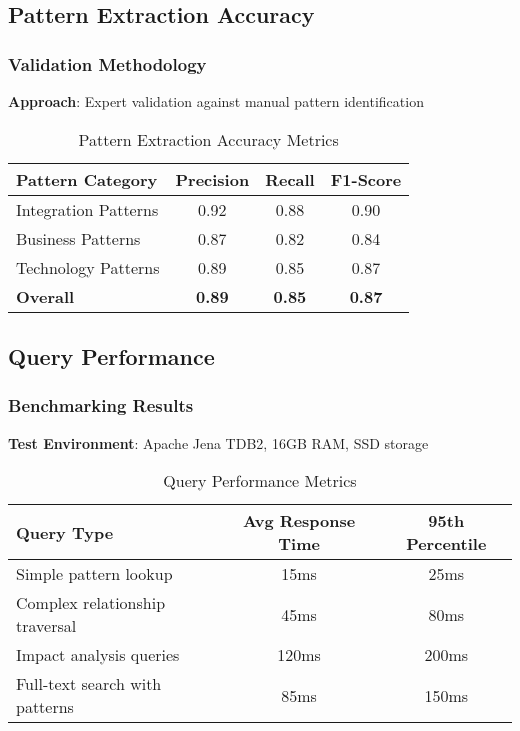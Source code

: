 \documentclass[12pt,a4paper]{article}
\begin{document}
\subsection{Pattern Extraction Accuracy}

\subsubsection{Validation Methodology}
\textbf{Approach}: Expert validation against manual pattern identification

\begin{table}[h]
\centering
\begin{tabular}{|l|c|c|c|}
\hline
\textbf{Pattern Category} & \textbf{Precision} & \textbf{Recall} & \textbf{F1-Score} \\
\hline
Integration Patterns & 0.92 & 0.88 & 0.90 \\
Business Patterns & 0.87 & 0.82 & 0.84 \\
Technology Patterns & 0.89 & 0.85 & 0.87 \\
\textbf{Overall} & \textbf{0.89} & \textbf{0.85} & \textbf{0.87} \\
\hline
\end{tabular}
\caption{Pattern Extraction Accuracy Metrics}
\end{table}

\subsection{Query Performance}

\subsubsection{Benchmarking Results}
\textbf{Test Environment}: Apache Jena TDB2, 16GB RAM, SSD storage

\begin{table}[h]
\centering
\begin{tabular}{|l|c|c|}
\hline
\textbf{Query Type} & \textbf{Avg Response Time} & \textbf{95th Percentile} \\
\hline
Simple pattern lookup & 15ms & 25ms \\
Complex relationship traversal & 45ms & 80ms \\
Impact analysis queries & 120ms & 200ms \\
Full-text search with patterns & 85ms & 150ms \\
\hline
\end{tabular}
\caption{Query Performance Metrics}
\end{table}
\end{document}
